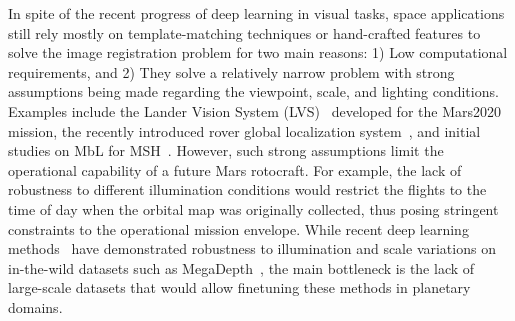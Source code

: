 In spite of the recent progress of deep learning in visual tasks, space applications still rely mostly on template-matching techniques or hand-crafted features to solve the image registration problem for two main reasons: 1) Low computational requirements, and 2) They solve a relatively narrow problem with strong assumptions being made regarding the viewpoint, scale, and lighting conditions.
Examples include the Lander Vision System (LVS)~\cite{johnson2023} developed for the Mars2020 mission, the recently introduced rover global localization system~\cite{nash2024}, and initial studies on MbL for MSH~\cite{brockers2022}.
However, such strong assumptions limit the operational capability of a future Mars rotocraft. For example, the lack of robustness to different illumination conditions would restrict the flights to the time of day when the orbital map was originally collected, thus posing stringent constraints to the operational mission envelope.
While recent deep learning methods~\cite{loftr,roma} have demonstrated robustness to illumination and scale variations on in-the-wild datasets such as MegaDepth~\cite{megadepth}, the main bottleneck is the lack of large-scale datasets that would allow finetuning these methods in planetary domains.


